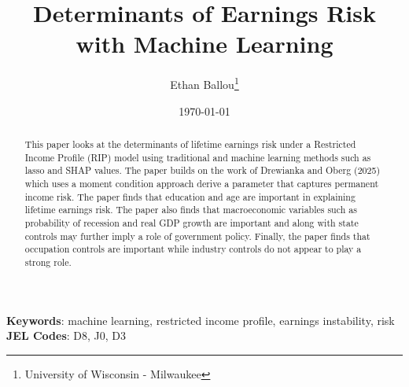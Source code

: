 \documentclass[12pt]{article}
\title{Determinants of Earnings Risk with Machine Learning}
\author{Ethan Ballou\thanks{University of Wisconsin - Milwaukee}}
\date{\today}
\begin{document}
\maketitle
\thispagestyle{empty}



\begin{abstract}
\begin{singlespace}


\noindent This paper looks at the determinants of lifetime earnings risk under a Restricted Income Profile (RIP) model using traditional and machine learning methods such as lasso and SHAP values. The paper builds on the work of Drewianka and Oberg (2025) which uses a moment condition approach derive a parameter that captures permanent income risk. The paper finds that education and age are important in explaining lifetime earnings risk. The paper also finds that macroeconomic variables such as probability of recession and real GDP growth are important and along with state controls may further imply a role of government policy. Finally, the paper finds that occupation controls are important while industry controls do not appear to play a strong role. 

\end{singlespace}
\end{abstract}


\vspace{1cm}

\noindent

\textbf{Keywords}: machine learning, restricted income profile, earnings instability, risk \\
\indent \textbf{JEL Codes}: D8, J0, D3\\




\clearpage
\setcounter{page}{1}
\end{document}

